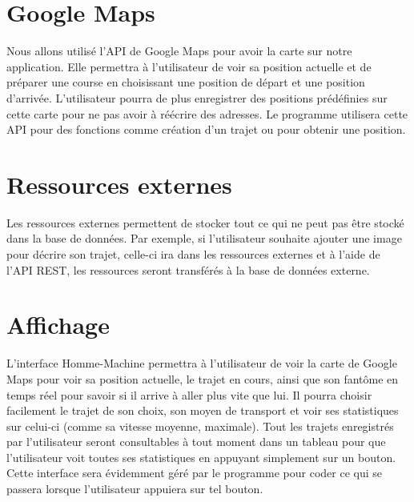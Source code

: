\section{Google Maps}
Nous allons utilisé l'\gls{API} de Google Maps pour avoir la carte sur notre application.
Elle permettra à l'utilisateur de voir sa position actuelle et de préparer une course en choisissant une position de départ et une position d'arrivée.
L'utilisateur pourra de plus enregistrer des positions prédéfinies sur cette carte pour ne pas avoir à réécrire des adresses.
Le programme utilisera cette \gls{API} pour des fonctions comme création d'un trajet ou pour obtenir une position.


\section{Ressources externes}
Les ressources externes permettent de stocker tout ce qui ne peut pas être stocké dans la base de données.
Par exemple, si l'utilisateur souhaite ajouter une image pour décrire son trajet, celle-ci ira dans les ressources externes et à l'aide de l'\gls{API} \gls{REST},
les ressources seront transférés à la base de données externe.


\section{Affichage}
L'interface Homme-Machine permettra à l'utilisateur de voir la carte de Google Maps pour voir sa position actuelle, le trajet en cours,
ainsi que son fantôme en temps réel pour savoir si il arrive à aller plus vite que lui.
Il pourra choisir facilement le trajet de son choix, son moyen de transport et voir ses statistiques sur celui-ci (comme sa vitesse moyenne, maximale).
Tout les trajets enregistrés par l'utilisateur seront consultables à tout moment dans un tableau pour que l'utilisateur voit toutes ses statistiques en appuyant simplement sur un bouton.
Cette interface sera évidemment géré par le programme pour coder ce qui se passera lorsque l'utilisateur appuiera sur tel bouton.